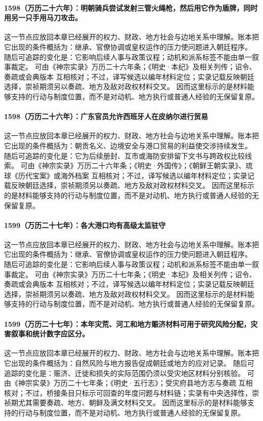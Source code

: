 \paragraph{1598（万历二十六年）：明朝骑兵尝试发射三管火绳枪，然后用它作为盾牌，同时用另一只手用马刀攻击。} 这一节点应放回本章已经展开的权力、财政、地方社会与边地关系中理解。账本把它出现的条件概括为：继承、官僚协调或皇权运作的压力使问题进入朝廷程序。 随后可追踪的变化是：它影响后续人事与政策议程；动机和派系标签不能由单一叙事裁定。 可由《神宗实录》万历二十六年条；《明史·本纪》及相关列传；诏令、奏疏或会典版本 互相核对；不过，译写候选以编年材料定位；实录记载反映朝廷选择，崇祯期须另以奏疏、地方及敌对政权材料交叉。 因而这里标示的是材料能够支持的行动与制度位置，而不是对动机、地方执行或普通人经验的无保留复原。

\paragraph{1598（万历二十六年）：广东官员允许西班牙人在皮纳尔进行贸易} 这一节点应放回本章已经展开的权力、财政、地方社会与边地关系中理解。账本把它出现的条件概括为：朝贡名义、边境安全与港口贸易的利益使交涉持续发生。 随后可追踪的变化是：它为后续册封、互市或海防安排留下文书与跨政权比较线索。 可由《神宗实录》万历二十六年条；《明史·外国传》；《朝鲜王朝实录》、琉球《历代宝案》或海外档案 互相核对；不过，译写候选以编年材料定位；实录记载反映朝廷选择，崇祯期须另以奏疏、地方及敌对政权材料交叉。 因而这里标示的是材料能够支持的行动与制度位置，而不是对动机、地方执行或普通人经验的无保留复原。

\paragraph{1599（万历二十七年）：各大港口均有高级太监驻守} 这一节点应放回本章已经展开的权力、财政、地方社会与边地关系中理解。账本把它出现的条件概括为：继承、官僚协调或皇权运作的压力使问题进入朝廷程序。 随后可追踪的变化是：它影响后续人事与政策议程；动机和派系标签不能由单一叙事裁定。 可由《神宗实录》万历二十七年条；《明史·本纪》及相关列传；诏令、奏疏或会典版本 互相核对；不过，译写候选以编年材料定位；实录记载反映朝廷选择，崇祯期须另以奏疏、地方及敌对政权材料交叉。 因而这里标示的是材料能够支持的行动与制度位置，而不是对动机、地方执行或普通人经验的无保留复原。

\paragraph{1599（万历二十七年）：本年灾荒、河工和地方赈济材料可用于研究风险分配，灾害叙事和统计数字应区分。} 这一节点应放回本章已经展开的权力、财政、地方社会与边地关系中理解。账本把它出现的条件概括为：自然风险与地方报告促成朝廷或地方的应对记录。 随后可追踪的变化是：赈济、迁徙和损失的实际范围仍须以受灾地区材料分别核验。 可由《神宗实录》万历二十七年条；《明史·五行志》；受灾府县地方志与奏疏 互相核对；不过，桥接条目只标示可回查的年度问题与材料链；实录有中央选择性，崇祯期尤其需要奏疏、地方、朝鲜及满文材料交叉。 因而这里标示的是材料能够支持的行动与制度位置，而不是对动机、地方执行或普通人经验的无保留复原。


